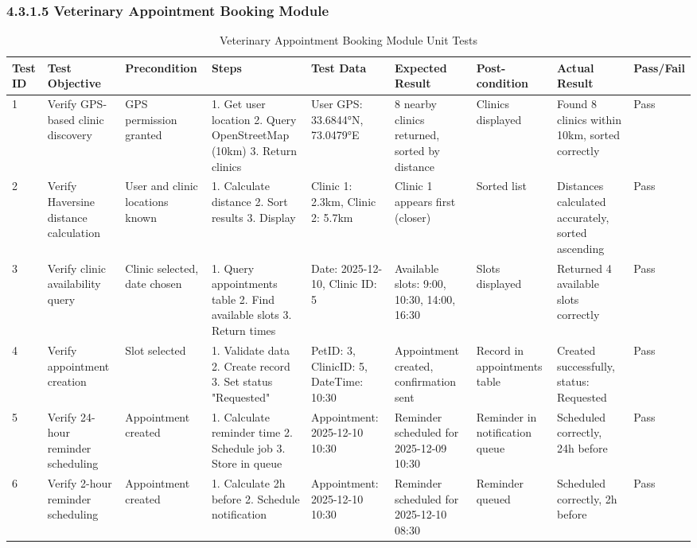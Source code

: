 \subsubsection{4.3.1.5 Veterinary Appointment Booking Module}

\begin{table}[H]
\centering
\caption{Veterinary Appointment Booking Module Unit Tests}
\tiny
\begin{tabular}{|p{0.4cm}|p{2cm}|p{1.2cm}|p{2cm}|p{2cm}|p{2cm}|p{1.5cm}|p{2cm}|p{0.7cm}|}
\hline
\textbf{Test ID} & \textbf{Test Objective} & \textbf{Precondition} & \textbf{Steps} & \textbf{Test Data} & \textbf{Expected Result} & \textbf{Post-condition} & \textbf{Actual Result} & \textbf{Pass/Fail} \\ \hline
1 & Verify GPS-based clinic discovery & GPS permission granted & 1. Get user location 2. Query OpenStreetMap (10km) 3. Return clinics & User GPS: 33.6844°N, 73.0479°E & 8 nearby clinics returned, sorted by distance & Clinics displayed & Found 8 clinics within 10km, sorted correctly & Pass \\ \hline
2 & Verify Haversine distance calculation & User and clinic locations known & 1. Calculate distance 2. Sort results 3. Display & Clinic 1: 2.3km, Clinic 2: 5.7km & Clinic 1 appears first (closer) & Sorted list & Distances calculated accurately, sorted ascending & Pass \\ \hline
3 & Verify clinic availability query & Clinic selected, date chosen & 1. Query appointments table 2. Find available slots 3. Return times & Date: 2025-12-10, Clinic ID: 5 & Available slots: 9:00, 10:30, 14:00, 16:30 & Slots displayed & Returned 4 available slots correctly & Pass \\ \hline
4 & Verify appointment creation & Slot selected & 1. Validate data 2. Create record 3. Set status "Requested" & PetID: 3, ClinicID: 5, DateTime: 10:30 & Appointment created, confirmation sent & Record in appointments table & Created successfully, status: Requested & Pass \\ \hline
5 & Verify 24-hour reminder scheduling & Appointment created & 1. Calculate reminder time 2. Schedule job 3. Store in queue & Appointment: 2025-12-10 10:30 & Reminder scheduled for 2025-12-09 10:30 & Reminder in notification queue & Scheduled correctly, 24h before & Pass \\ \hline
6 & Verify 2-hour reminder scheduling & Appointment created & 1. Calculate 2h before 2. Schedule notification & Appointment: 2025-12-10 10:30 & Reminder scheduled for 2025-12-10 08:30 & Reminder queued & Scheduled correctly, 2h before & Pass \\ \hline

\end{tabular}
\end{table}
